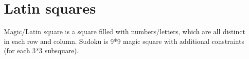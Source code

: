 \chapter{Latin squares}

Magic/Latin square is a square filled with numbers/letters, which are all distinct in each row and column.
Sudoku is 9*9 magic square with additional constraints (for each 3*3 subsquare).



